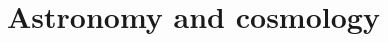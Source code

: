 \documentclass[main.tex]{subfiles}
\begin{document}
\chapter{Astronomy and cosmology}
\end{document}

